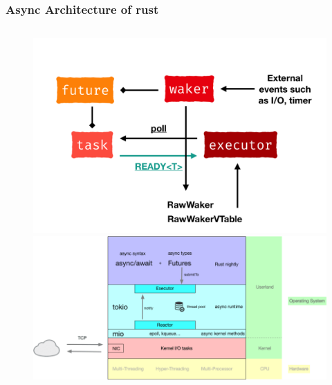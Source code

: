 \begin{frame}[fragile]
    \frametitle{Async Architecture of rust}
    \begin{columns}
        \begin{column}{.4\textwidth}
            \centering
            \begin{figure}
                \includegraphics[width=1.\linewidth]{figs/rust-async-simple-arch.png}
                \includegraphics[width=.8\linewidth]{figs/rust-async-arch.png}
            \end{figure}
        \end{column}
        

\end{columns}
\end{frame}

